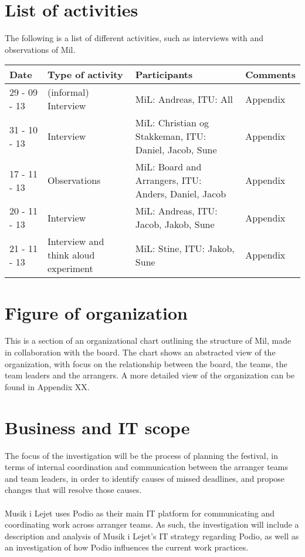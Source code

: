 \section{List of activities}
The following is a list of different activities, such as interviews with and observations of Mil.
\begin{center}
\begin{table}[H]
    \begin{tabular}{|p{3cm}|p{3cm}|p{3cm}|p{6cm}|}
    \hline
    \textbf{Date} & \textbf{Type of activity} & \textbf{Participants} & \textbf{Comments} \\ \hline
    29 - 09 - 13 & (informal) Interview & MiL: Andreas, ITU: All & Appendix  \\ \hline
    31 - 10 - 13 & Interview & MiL: Christian og Stakkeman, ITU: Daniel, Jacob, Sune &  Appendix  \\ \hline
    17 - 11 - 13 & Observations & MiL: Board and Arrangers, ITU: Anders, Daniel, Jacob & Appendix \\ \hline
    20 - 11 - 13 & Interview & MiL: Andreas, ITU: Jacob, Jakob, Sune & Appendix \\ \hline
    21 - 11 - 13 & Interview and think aloud experiment & MiL: Stine, ITU: Jakob, Sune & Appendix \\ \hline
    \end{tabular}
\end{table}
\end{center}

\section{Figure of organization}
\label{sec:organisation}
This is a section of an organizational chart outlining the structure of Mil, made in collaboration with the board. The chart shows an abstracted view of the organization, with focus on the relationship between the board, the teams, the team leaders and the arrangers. A more detailed view of the organization can be found in Appendix XX.\\
\section{Business and IT scope}
The focus of the investigation will be the process of planning the festival, in terms of internal coordination and communication between the arranger teams and team leaders, in order to identify causes of missed deadlines, and propose changes that will resolve those causes.
\\ \\
Musik i Lejet uses Podio as their main IT platform for communicating and coordinating work across arranger teams. As such, the investigation will include a description and analysis of Musik i Lejet's IT strategy regarding Podio, as well as an investigation of how Podio influences the current work practices.
